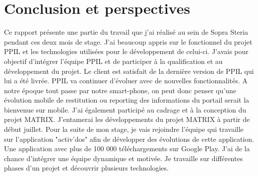 \chapter*{Conclusion et perspectives}
\label{sec:conclusion}

Ce rapport présente une partie du travail que j'ai réalisé au sein de Sopra Steria pendant ces deux mois de stage. J'ai beaucoup appris sur le fonctionnel du projet PPIL et les technologies utilisées pour le développement de celui-ci. J'avais pour objectif d'intégrer l'équipe PPIL et de participer à la qualification et au développement du projet. Le client est satisfait de la dernière version de PPIL qui lui a été livrée. PPIL va continuer d'évoluer avec de nouvelles fonctionnalités. A notre époque tout passe par notre smart-phone, on peut donc penser qu'une évolution mobile de restitution ou reporting des informations du portail serait la bienvenue sur mobile. J'ai également participé au cadrage et à la conception du projet MATRIX. J'entamerai les développements du projet MATRIX à partir de début juillet. 
Pour la suite de mon stage, je vais rejoindre l'équipe qui travaille sur l'application "activ'dos" afin de développer des évolutions de cette application. Une application avec plus de 100 000 téléchargements sur Google Play. J'ai de la chance d'intégrer une équipe dynamique et motivée. Je travaille sur différentes phases d'un projet et découvrir plusieurs technologies.



